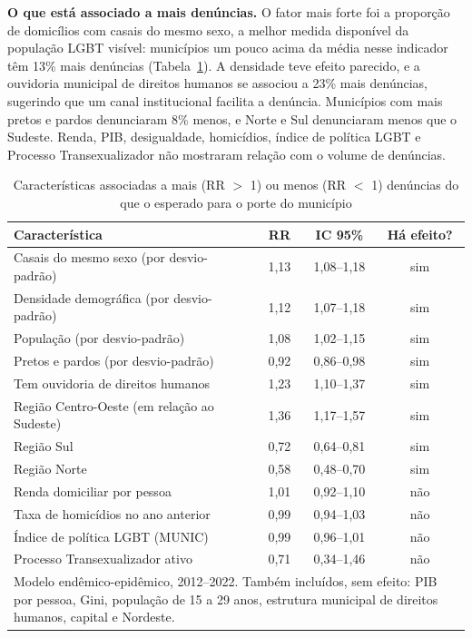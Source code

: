 \documentclass[12pt]{article}
\begin{document}
\textbf{O que está associado a mais denúncias.} O fator mais forte foi a proporção de domicílios com casais do mesmo sexo, a melhor medida disponível da população LGBT visível: municípios um pouco acima da média nesse indicador têm 13\% mais denúncias (Tabela~\ref{tab:coef}). A densidade teve efeito parecido, e a ouvidoria municipal de direitos humanos se associou a 23\% mais denúncias, sugerindo que um canal institucional facilita a denúncia. Municípios com mais pretos e pardos denunciaram 8\% menos, e Norte e Sul denunciaram menos que o Sudeste. Renda, PIB, desigualdade, homicídios, índice de política LGBT e Processo Transexualizador não mostraram relação com o volume de denúncias.

\begin{table}[!htb]
\centering
\caption{Características associadas a mais (RR $>$ 1) ou menos (RR $<$ 1) denúncias do que o esperado para o porte do município}
\label{tab:coef}
{\renewcommand{\arraystretch}{1.15}\small
\begin{tabular}{p{6.8cm} c c c}
\toprule
\textbf{Característica} & \textbf{RR} & \textbf{IC 95\%} & \textbf{Há efeito?} \\
\midrule
Casais do mesmo sexo (por desvio-padrão) & 1,13 & 1,08--1,18 & sim \\
Densidade demográfica (por desvio-padrão) & 1,12 & 1,07--1,18 & sim \\
População (por desvio-padrão) & 1,08 & 1,02--1,15 & sim \\
Pretos e pardos (por desvio-padrão) & 0,92 & 0,86--0,98 & sim \\
Tem ouvidoria de direitos humanos & 1,23 & 1,10--1,37 & sim \\
Região Centro-Oeste (em relação ao Sudeste) & 1,36 & 1,17--1,57 & sim \\
Região Sul & 0,72 & 0,64--0,81 & sim \\
Região Norte & 0,58 & 0,48--0,70 & sim \\
Renda domiciliar por pessoa & 1,01 & 0,92--1,10 & não \\
Taxa de homicídios no ano anterior & 0,99 & 0,94--1,03 & não \\
Índice de política LGBT (MUNIC) & 0,99 & 0,96--1,01 & não \\
Processo Transexualizador ativo & 0,71 & 0,34--1,46 & não \\
\bottomrule
\multicolumn{4}{p{12cm}}{\footnotesize Modelo endêmico-epidêmico, 2012--2022. Também incluídos, sem efeito: PIB por pessoa, Gini, população de 15 a 29 anos, estrutura municipal de direitos humanos, capital e Nordeste.}
\end{tabular}}
\end{table}
\end{document}
